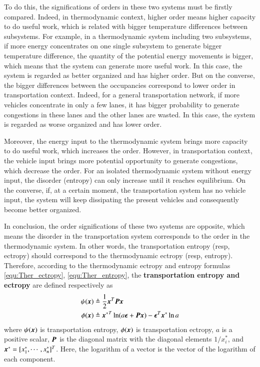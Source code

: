 \documentclass[preprint,authoryear,12pt]{elsarticle}
\renewcommand{\vec}[1]{\mbox{\boldmath$#1$}}
\newcommand{\mat}[1]{\mbox{\boldmath$#1$}}
\begin{document}
To do this, the significations of orders in these two systems must be firstly compared. Indeed, in thermodynamic context, higher order means higher capacity to do useful work, which is related with bigger temperature differences between subsystems. For example, in a thermodynamic system including two subsystems, if more energy concentrates on one single subsystem to generate bigger temperature difference, the quantity of the potential energy movements is bigger, which means that the system can generate more useful work. In this case, the system is regarded as better organized and has higher order. But on the converse, the bigger differences between the occupancies correspond to lower order in transportation context. Indeed, for a general transportation network, if more vehicles concentrate in only a few lanes, it has bigger probability to generate congestions in these lanes and the other lanes are wasted. In this case, the system is regarded as worse organized and has lower order.

Moreover, the energy input to the thermodynamic system brings more capacity to do useful work, which increases the order. However, in transportation context, the vehicle input brings more potential opportunity to generate congestions, which decrease the order. For an isolated thermodynamic system without energy input, the disorder (entropy) can only increase until it reaches equilibrium. On the converse, if, at a certain moment, the transportation system has no vehicle input, the system will keep dissipating the present vehicles and consequently become better organized.

In conclusion, the order significations of these two systems are opposite, which means the disorder in the transportation system corresponds to the order in the thermodynamic system. In other words, the transportation entropy (resp, ectropy) should correspond to the thermodynamic ectropy (resp, entropy). Therefore, according to the thermodynamic ectropy and entropy formulas \eqref{equ:Ther_ectropy}, \eqref{equ:Ther_entropy}, the \textbf{transportation entropy and ectropy} are defined respectively as
\begin{align}
\label{equ:Tran_entropy}
\psi(\vec{x}) &\triangleq \frac{1}{2}\vec{x}^T \mat{P} \vec{x}\\
\phi(\vec{x}) &\triangleq{\vec{x}^*}^T \ln
(a\vec{\epsilon}+\mat{P}\vec{x}) -\vec{\epsilon}^T\vec{x}^*\ln a
\label{equ:Tran_ectropy}
\end{align}
where $\psi(\vec{x})$ is transportation entropy, $\phi(\vec{x})$ is transportation ectropy, $a$ is a positive scalar, $\mat{P}$ is the diagonal matrix with the diagonal elements $1/x_i^*$, and $\vec{x}^*=[x_1^*,\cdots,x_n^*]^T$. Here, the logarithm of a vector is the vector of the logarithm of each component.
\end{document}
